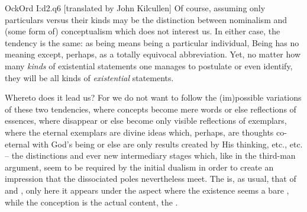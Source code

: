 \citet{[b]ecause singularity immediately befits that to which it belongs,
  therefore it cannot befit it through something else; therefore if something is
  singular, it is singular by itself.}{OckOrd}{ I:d2.q6  [translated by
  John Kilcullen]\label{ftnt:noPrincInd}}
%
Of course, assuming only particulars versus their kinds may be the
distinction between nominalism and (some form of) conceptualism which does not
interest us. In either case, the tendency is the same: as being means being a
particular individual, Being has no meaning except, perhaps, as a totally
equivocal abbreviation.  Yet, no matter how many {\em kinds} of existential statements
one manages to postulate or even identify, they will be all kinds of {\em
  existential} statements.

\pa Whereto does it lead us? For we do not want to follow the (im)possible
variations of these two tendencies, where concepts become mere words or else
 reflections of essences, where  disappear or else become
only visible reflections of exemplars, where the eternal exemplars are divine ideas
which, perhaps, are thoughts co-eternal with God's being or else are only
results created by His thinking, etc., etc. -- the distinctions and ever new
intermediary stages which, like in the third-man argument, seem to be required
by the initial dualism in order to create an impression that the dissociated
poles nevertheless meet. The  is, as usual, that of 
and , only here it appears under the aspect where the
 existence seems a bare , while the 
conception is the actual content, the .

